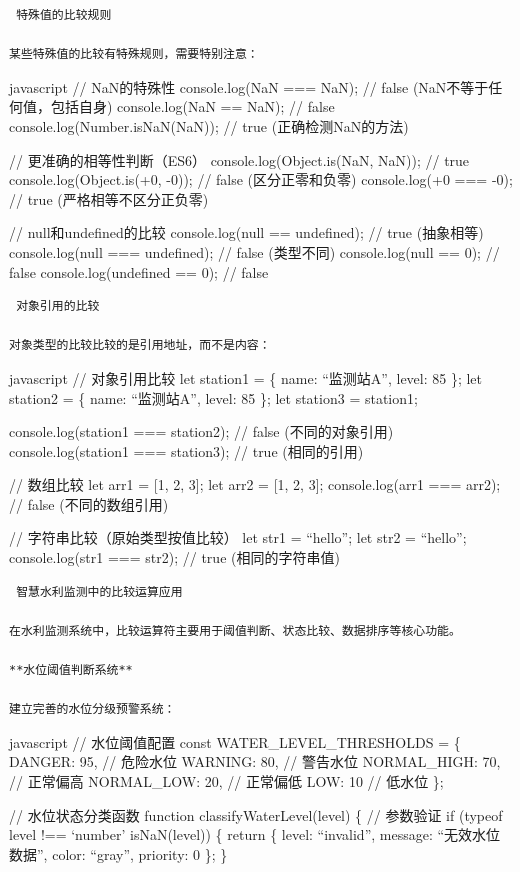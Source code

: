 \begin{lstlisting}
 特殊值的比较规则

某些特殊值的比较有特殊规则，需要特别注意：
\end{lstlisting}

javascript // NaN的特殊性 console.log(NaN === NaN); // false (NaN不等于任何值，包括自身) console.log(NaN == NaN); // false console.log(Number.isNaN(NaN)); // true (正确检测NaN的方法)

// 更准确的相等性判断（ES6） console.log(Object.is(NaN, NaN)); // true console.log(Object.is(+0, -0)); // false (区分正零和负零) console.log(+0 === -0); // true (严格相等不区分正负零)

// null和undefined的比较 console.log(null == undefined); // true (抽象相等) console.log(null === undefined); // false (类型不同) console.log(null == 0); // false console.log(undefined == 0); // false

\begin{lstlisting}
 对象引用的比较

对象类型的比较比较的是引用地址，而不是内容：
\end{lstlisting}

javascript // 对象引用比较 let station1 = \{ name: ``监测站A'', level: 85 \}; let station2 = \{ name: ``监测站A'', level: 85 \}; let station3 = station1;

console.log(station1 === station2); // false (不同的对象引用) console.log(station1 === station3); // true (相同的引用)

// 数组比较 let arr1 = {[}1, 2, 3{]}; let arr2 = {[}1, 2, 3{]}; console.log(arr1 === arr2); // false (不同的数组引用)

// 字符串比较（原始类型按值比较） let str1 = ``hello''; let str2 = ``hello''; console.log(str1 === str2); // true (相同的字符串值)

\begin{lstlisting}
 智慧水利监测中的比较运算应用

在水利监测系统中，比较运算符主要用于阈值判断、状态比较、数据排序等核心功能。

**水位阈值判断系统**

建立完善的水位分级预警系统：
\end{lstlisting}

javascript // 水位阈值配置 const WATER\_LEVEL\_THRESHOLDS = \{ DANGER: 95, // 危险水位 WARNING: 80, // 警告水位 NORMAL\_HIGH: 70, // 正常偏高 NORMAL\_LOW: 20, // 正常偏低 LOW: 10 // 低水位 \};

// 水位状态分类函数 function classifyWaterLevel(level) \{ // 参数验证 if (typeof level !== `number' \textbar\textbar{} isNaN(level)) \{ return \{ level: ``invalid'', message: ``无效水位数据'', color: ``gray'', priority: 0 \}; \}

